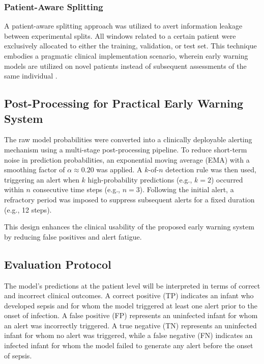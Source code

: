 \documentclass[conference]{IEEEtran}
\begin{document}
\subsubsection{Patient-Aware Splitting}
A patient-aware splitting approach was utilized to avert information leakage between experimental splits. All windows related to a certain patient were exclusively allocated to either the training, validation, or test set. This technique embodies a pragmatic clinical implementation scenario, wherein early warning models are utilized on novel patients instead of subsequent assessments of the same individual \cite{Che2018RNNMissing}.


\subsection{Post-Processing for Practical Early Warning System}

The raw model probabilities were converted into a clinically deployable alerting mechanism using a multi-stage post-processing pipeline. To reduce short-term noise in prediction probabilities, an exponential moving average (EMA) with a smoothing factor of $\alpha \approx 0.20$ was applied. A $k$-of-$n$ detection rule was then used, triggering an alert when $k$ high-probability predictions (e.g., $k=2$) occurred within $n$ consecutive time steps (e.g., $n=3$). Following the initial alert, a refractory period was imposed to suppress subsequent alerts for a fixed duration (e.g., 12 steps).

This design enhances the clinical usability of the proposed early warning system by reducing false positives and alert fatigue.



\subsection{Evaluation Protocol}

The model’s predictions at the patient level will be interpreted in terms of correct and incorrect clinical outcomes. A correct positive (TP) indicates an infant who developed sepsis and for whom the model triggered at least one alert prior to the onset of infection. A false positive (FP) represents an uninfected infant for whom an alert was incorrectly triggered. A true negative (TN) represents an uninfected infant for whom no alert was triggered, while a false negative (FN) indicates an infected infant for whom the model failed to generate any alert before the onset of sepsis.
\end{document}
